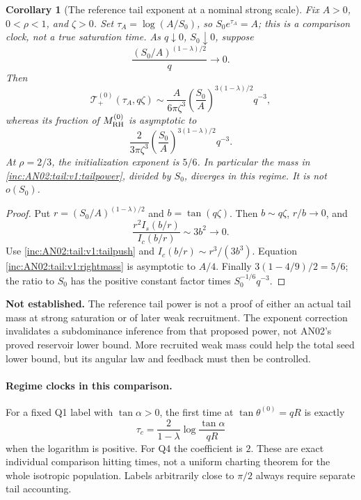 \documentclass[11pt]{article}
\numberwithin{equation}{section}
\newtheorem{corollary}[theorem]{Corollary}
\theoremstyle{remark}\newtheorem{remark}[theorem]{Remark}
\newcommand{\1}{\mathbf 1}
\newcommand{\gap}[1]{\par\noindent\textbf{Not established.} #1\par\smallskip}
\begin{document}
\begin{corollary}[The reference tail exponent at a nominal strong scale]
\label{inc:AN02:tail:v1:exponent}
Fix $A>0$, $0<\rho<1$, and $\zeta>0$. Set
$\tau_A=\log(A/S_0)$, so $S_0e^{\tau_A}=A$; this is a
\emph{comparison} clock, not a true saturation time. As $q\downarrow0$,
$S_0\downarrow0$, suppose
\[
 \frac{(S_0/A)^{(1-\lambda)/2}}q\longrightarrow0.
\]
Then
\begin{equation}\label{inc:AN02:tail:v1:tailpower}
 \mathcal T_+^{(0)}(\tau_A,q\zeta)
 \sim\frac{A}{6\pi\zeta^3}
 \left(\frac{S_0}{A}\right)^{3(1-\lambda)/2}q^{-3},
\end{equation}
whereas its fraction of $M_{\rm RH}^{(0)}$ is asymptotic to
\begin{equation}\label{inc:AN02:tail:v1:tailfraction}
 \frac{2}{3\pi\zeta^3}
 \left(\frac{S_0}{A}\right)^{3(1-\lambda)/2}q^{-3}.
\end{equation}
At $\rho=2/3$, the initialization exponent is $5/6$.
In particular the mass in \eqref{inc:AN02:tail:v1:tailpower}, divided by
$S_0$, diverges in this regime. It is not $o(S_0)$.
\end{corollary}
\begin{proof}
Put $r=(S_0/A)^{(1-\lambda)/2}$ and $b=\tan(q\zeta)$.
Then $b\sim q\zeta$, $r/b\to0$, and
\[
 \frac{r^2I_s(b/r)}{I_c(b/r)}\sim3b^2\to0.
\]
Use \eqref{inc:AN02:tail:v1:tailpush} and
$I_c(b/r)\sim r^3/(3b^3)$. Equation
\eqref{inc:AN02:tail:v1:rightmass} is asymptotic to $A/4$.
Finally $3(1-4/9)/2=5/6$; the ratio to $S_0$ has the positive
constant factor times $S_0^{-1/6}q^{-3}$.
\end{proof}
\gap{The reference tail power is not a proof of either an actual tail mass
at strong saturation or of later weak recruitment. The exponent correction
invalidates a subdominance inference from that proposed power, not AN02's
proved reservoir lower bound. More recruited weak mass could help the total
seed lower bound, but its angular law and feedback must then be controlled.}

\paragraph{Regime clocks in this comparison.}
For a fixed Q1 label with $\tan\alpha>0$, the first time at
$\tan\theta^{(0)}=qR$ is exactly
\[
 \tau_c=\frac{2}{1-\lambda}\log\frac{\tan\alpha}{qR}
\]
when the logarithm is positive. For Q4 the coefficient is $2$.
These are exact individual comparison hitting times, not a uniform
charting theorem for the whole isotropic population. Labels arbitrarily
close to $\pi/2$ always require separate tail accounting.
\end{document}
